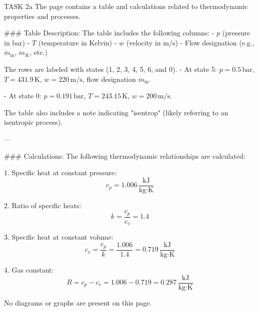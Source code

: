 TASK 2a  
The page contains a table and calculations related to thermodynamic properties and processes.  

### Table Description:  
The table includes the following columns:  
- \( p \) (pressure in bar)  
- \( T \) (temperature in Kelvin)  
- \( w \) (velocity in \( \text{m/s} \))  
- Flow designation (e.g., \( \dot{m}_{\text{in}} \), \( \dot{m}_K \), etc.)  

The rows are labeled with states (1, 2, 3, 4, 5, 6, and 0).  
- At state 5:  
  \( p = 0.5 \, \text{bar} \), \( T = 431.9 \, \text{K} \), \( w = 220 \, \text{m/s} \), flow designation \( \dot{m}_{\text{in}} \).  

- At state 0:  
  \( p = 0.191 \, \text{bar} \), \( T = 243.15 \, \text{K} \), \( w = 200 \, \text{m/s} \).  

The table also includes a note indicating "isentrop" (likely referring to an isentropic process).  

---

### Calculations:  
The following thermodynamic relationships are calculated:  

1. Specific heat at constant pressure:  
   \[
   c_p = 1.006 \, \frac{\text{kJ}}{\text{kg·K}}
   \]

2. Ratio of specific heats:  
   \[
   k = \frac{c_p}{c_v} = 1.4
   \]

3. Specific heat at constant volume:  
   \[
   c_v = \frac{c_p}{k} = \frac{1.006}{1.4} = 0.719 \, \frac{\text{kJ}}{\text{kg·K}}
   \]

4. Gas constant:  
   \[
   R = c_p - c_v = 1.006 - 0.719 = 0.287 \, \frac{\text{kJ}}{\text{kg·K}}
   \]  

No diagrams or graphs are present on this page.